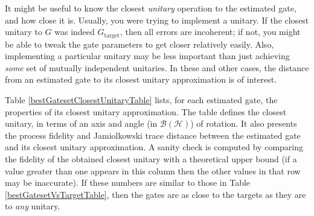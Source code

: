 \documentclass{article}[11pt]
\begin{document}
It might be useful to know the closest \emph{unitary} operation to the estimated gate, and how close it is.  Usually, you were trying to implement a unitary.  If the closest unitary to $G$ was indeed $G_{\mathrm{target}}$, then all errors are incoherent; if not, you might be able to tweak the gate parameters to get closer relatively easily.  Also, implementing a particular unitary may be less important than just achieving \emph{some} set of mutually independent unitaries.  In these and other cases, the distance from an estimated gate to its closest unitary approximation is of interest.

Table \ref{bestGatesetClosestUnitaryTable} lists, for each estimated gate, the properties of its closest unitary approximation.  The table defines the closest unitary, in terms of an axis and angle (in $\mathcal{B}(\mathcal{H})$) of rotation.  It also presents the process fidelity and Jamiolkowski trace distance between the estimated gate and its closest unitary approximation.  A sanity check is computed by comparing the fidelity of the obtained closest unitary with a theoretical upper bound (if a value greater than one appears in this column then the other values in that row may be inaccurate).  If these numbers are similar to those in Table \ref{bestGatesetVsTargetTable}, then the gates are as close to the targets as they are to \emph{any} unitary.
\end{document}

